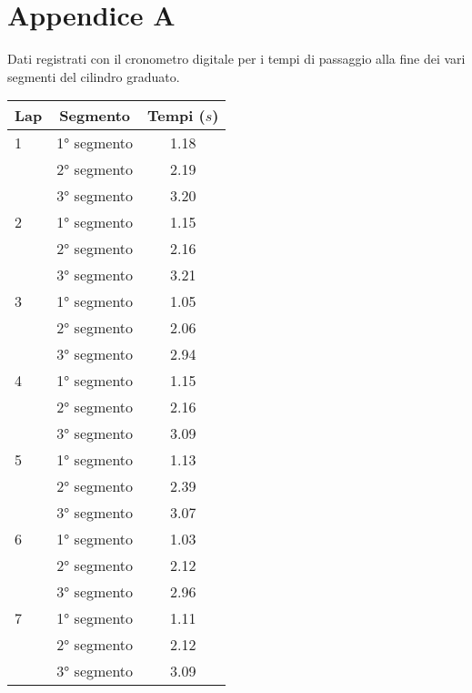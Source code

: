 \documentclass{article}
\begin{document}
\newpage
\appendix %
\section*{Appendice A} %
Dati registrati con il cronometro digitale per i tempi di passaggio alla fine dei vari segmenti del cilindro graduato.

\begin{table}[htbp]
    \centering
    \begin{minipage}{0.45\textwidth}
    \centering
    \begin{tabular}{lcc}
        \toprule
        \textbf{Lap }& \textbf{Segmento} & \textbf{Tempi ($s$)} \\
        \midrule
        1 & 1° segmento & 1.18 \\
          & 2° segmento & 2.19 \\
          & 3° segmento & 3.20 \\
        \midrule
        2 & 1° segmento & 1.15 \\
          & 2° segmento & 2.16 \\
          & 3° segmento & 3.21 \\
        \midrule
        3 & 1° segmento & 1.05 \\
          & 2° segmento & 2.06 \\
          & 3° segmento & 2.94 \\
        \midrule
        4 & 1° segmento & 1.15 \\
          & 2° segmento & 2.16 \\
          & 3° segmento & 3.09 \\
        \midrule
        5 & 1° segmento & 1.13 \\
          & 2° segmento & 2.39 \\
          & 3° segmento & 3.07 \\
        \midrule
        6 & 1° segmento & 1.03 \\
          & 2° segmento & 2.12 \\
          & 3° segmento & 2.96 \\
        \midrule
        7 & 1° segmento & 1.11 \\
          & 2° segmento & 2.12 \\
          & 3° segmento & 3.09 \\

\end{tabular}
\end{minipage}
\end{table}
\end{document}
